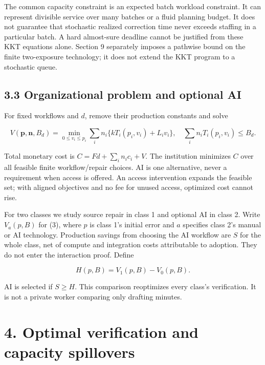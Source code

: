 \documentclass[
  11pt,
  a4paper,
]{article}
\begin{document}
The common capacity constraint is an expected batch workload constraint.
It can represent divisible service over many batches or a fluid planning
budget. It does not guarantee that stochastic realized correction time
never exceeds staffing in a particular batch. A hard almost-sure
deadline cannot be justified from these KKT equations alone. Section 9
separately imposes a pathwise bound on the finite two-exposure
technology; it does not extend the KKT program to a stochastic queue.

\hypertarget{organizational-problem-and-optional-ai}{%
\subsection{3.3 Organizational problem and optional
AI}\label{organizational-problem-and-optional-ai}}

For fixed workflows and \(d\), remove their production constants and
solve

\[V(\mathbf p,\mathbf n,B_d)=\min_{0\leq v_i\leq p_i}
 \sum_i n_i\{kT_i(p_i,v_i)+L_i v_i\},
\quad \sum_i n_iT_i(p_i,v_i)\leq B_d. \tag{3}\]

Total monetary cost is \(C=Fd+\sum_i n_i c_i+V\). The institution
minimizes \(C\) over all feasible finite workflow/repair choices. AI is
one alternative, never a requirement when access is offered. An access
intervention expands the feasible set; with aligned objectives and no
fee for unused access, optimized cost cannot rise.

For two classes we study source repair in class 1 and optional AI in
class 2. Write \(V_a(p,B)\) for (3), where \(p\) is class 1's initial
error and \(a\) specifies class 2's manual or AI technology. Production
savings from choosing the AI workflow are \(S\) for the whole class, net
of compute and integration costs attributable to adoption. They do not
enter the interaction proof. Define

\[H(p,B)=V_1(p,B)-V_0(p,B). \tag{4}\]

AI is selected if \(S\geq H\). This comparison reoptimizes every class's
verification. It is not a private worker comparing only drafting
minutes.

\hypertarget{optimal-verification-and-capacity-spillovers}{%
\section{4. Optimal verification and capacity
spillovers}\label{optimal-verification-and-capacity-spillovers}}
\end{document}
